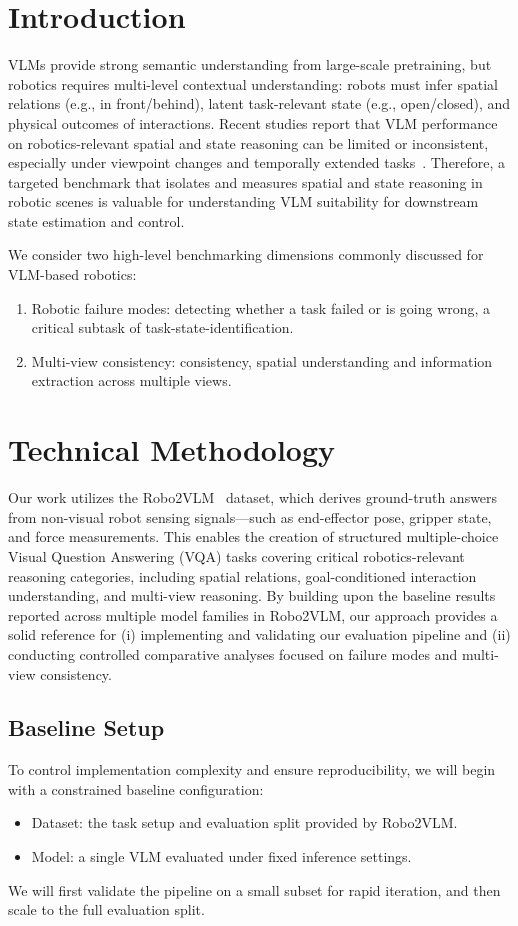 \documentclass[10pt,twocolumn,letterpaper]{article}
\begin{document}
\section{Introduction}
VLMs provide strong semantic understanding from large-scale pretraining, but robotics requires multi-level contextual understanding: robots must infer spatial relations (e.g., in front/behind), latent task-relevant state (e.g., open/closed), and physical outcomes of interactions.
Recent studies report that VLM performance on robotics-relevant spatial and state reasoning can be limited or inconsistent, especially under viewpoint changes and temporally extended tasks~\cite{chen2025robo2vlm,cai2025spatialbot,zitkovich2023rt2}.
Therefore, a targeted benchmark that isolates and measures spatial and state reasoning in robotic scenes is valuable for understanding VLM suitability for downstream state estimation and control.

We consider two high-level benchmarking dimensions commonly discussed for VLM-based robotics:
\begin{enumerate}
  \item Robotic failure modes: detecting whether a task failed or is going wrong, a critical subtask of task-state-identification. 
  \item Multi-view consistency: consistency, spatial understanding and information extraction across multiple views. 
\end{enumerate}

\section{Technical Methodology}
Our work utilizes the Robo2VLM~\cite{chen2025robo2vlm} dataset, which derives ground-truth answers from non-visual robot sensing signals—such as end-effector pose, gripper state, and force measurements. This enables the creation of structured multiple-choice Visual Question Answering (VQA) tasks covering critical robotics-relevant reasoning categories, including spatial relations, goal-conditioned interaction understanding, and multi-view reasoning. By building upon the baseline results reported across multiple model families in Robo2VLM, our approach provides a solid reference for (i) implementing and validating our evaluation pipeline and (ii) conducting controlled comparative analyses focused on failure modes and multi-view consistency.


\subsection{Baseline Setup}
To control implementation complexity and ensure reproducibility, we will begin with a constrained baseline configuration:
\begin{itemize}
  \item Dataset: the task setup and evaluation split provided by Robo2VLM.
  \item Model: a single VLM evaluated under fixed inference settings.
\end{itemize}
We will first validate the pipeline on a small subset for rapid iteration, and then scale to the full evaluation split.
\end{document}
